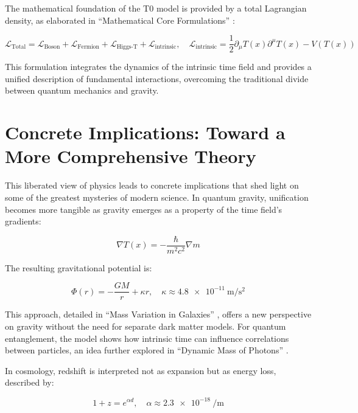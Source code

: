 \documentclass[a4paper,12pt]{article}
\newcommand{\Tfield}{T(x)}
\begin{document}
	The mathematical foundation of the T0 model is provided by a total Lagrangian density, as elaborated in “Mathematical Core Formulations” \cite{pascher_lagrange_2025}:
	
	\begin{equation}
		\mathcal{L}_{\text{Total}} = \mathcal{L}_{\text{Boson}} + \mathcal{L}_{\text{Fermion}} + \mathcal{L}_{\text{Higgs-T}} + \mathcal{L}_{\text{intrinsic}}, \quad \mathcal{L}_{\text{intrinsic}} = \frac{1}{2} \partial_\mu \Tfield \partial^\mu \Tfield - V(\Tfield)
	\end{equation}
	
	This formulation integrates the dynamics of the intrinsic time field and provides a unified description of fundamental interactions, overcoming the traditional divide between quantum mechanics and gravity.
	
	\section{Concrete Implications: Toward a More Comprehensive Theory}
	
	This liberated view of physics leads to concrete implications that shed light on some of the greatest mysteries of modern science. In quantum gravity, unification becomes more tangible as gravity emerges as a property of the time field’s gradients:
	
	\begin{equation}
		\nabla \Tfield = -\frac{\hbar}{m^2 c^2} \nabla m
	\end{equation}
	
	The resulting gravitational potential is:
	
	\begin{equation}
		\Phi(r) = -\frac{G M}{r} + \kappa r, \quad \kappa \approx \SI{4.8e-11}{\meter\per\second\squared}
	\end{equation}
	
	This approach, detailed in “Mass Variation in Galaxies” \cite{pascher_galaxies_2025}, offers a new perspective on gravity without the need for separate dark matter models. For quantum entanglement, the model shows how intrinsic time can influence correlations between particles, an idea further explored in “Dynamic Mass of Photons” \cite{pascher_photons_2025}.
	
	In cosmology, redshift is interpreted not as expansion but as energy loss, described by:
	
	\begin{equation}
		1 + z = e^{\alpha d}, \quad \alpha \approx \SI{2.3e-18}{\per\meter}
	\end{equation}
	
\end{document}
